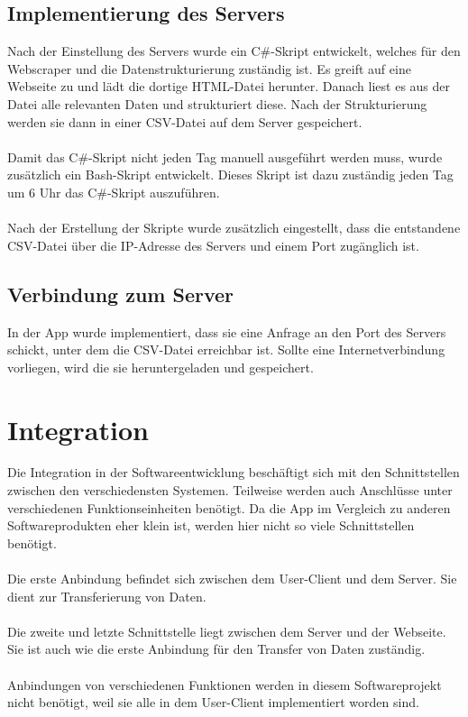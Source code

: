 \documentclass[conference]{IEEEtran}
\begin{document}
\subsection{Implementierung des Servers}
Nach der Einstellung des Servers wurde ein C\#-Skript entwickelt, welches für den Webscraper und die Datenstrukturierung zuständig ist. Es greift  auf eine Webseite zu und lädt die dortige HTML-Datei herunter. Danach liest es aus der Datei alle relevanten Daten und strukturiert diese. Nach der Strukturierung werden sie dann in einer CSV-Datei auf dem Server gespeichert. \\\\ Damit das C\#-Skript nicht jeden Tag manuell ausgeführt werden muss, wurde zusätzlich ein Bash-Skript entwickelt. Dieses Skript ist dazu zuständig jeden Tag um 6 Uhr das C\#-Skript auszuführen. \\\\ Nach der Erstellung der Skripte wurde zusätzlich eingestellt, dass die entstandene CSV-Datei über die IP-Adresse des Servers und einem Port zugänglich ist.

\subsection{Verbindung zum Server}
In der App wurde implementiert, dass sie eine Anfrage an den Port des Servers schickt, unter dem die CSV-Datei erreichbar ist. Sollte eine Internetverbindung vorliegen, wird die sie heruntergeladen und gespeichert.

\section{Integration}
Die Integration in der Softwareentwicklung beschäftigt sich mit den Schnittstellen zwischen den verschiedensten Systemen. Teilweise werden auch Anschlüsse unter verschiedenen Funktionseinheiten benötigt. Da die App im Vergleich zu anderen Softwareprodukten eher klein ist, werden hier nicht so viele Schnittstellen benötigt. \\\\ Die erste Anbindung befindet sich zwischen dem User-Client und dem Server. Sie dient zur Transferierung von Daten. \\\\ Die zweite und letzte Schnittstelle liegt zwischen dem Server und der Webseite. Sie ist auch wie die erste Anbindung für den Transfer von Daten zuständig. \\\\ Anbindungen von verschiedenen Funktionen werden in diesem Softwareprojekt nicht benötigt, weil sie alle in dem User-Client implementiert worden sind.
\end{document}
